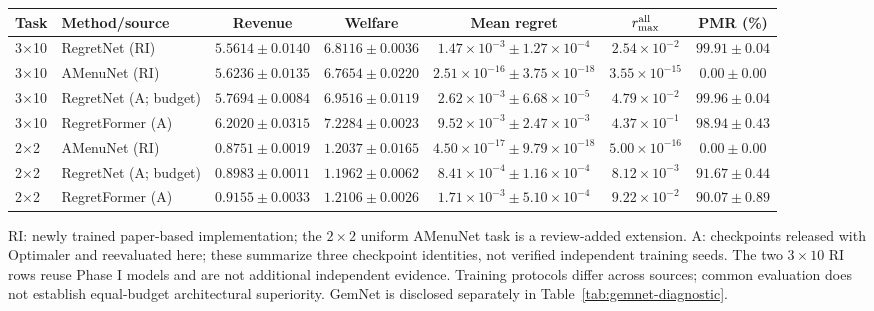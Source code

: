 \begin{table}[!t]
\centering\footnotesize
{}
\label{tab:phase2main}
\setlength{\tabcolsep}{4pt}
\begin{tabular}{llccccc}
\toprule
Task & Method/source & Revenue & Welfare & Mean regret & $r_{\max}^{\rm all}$ & PMR (\%) \\
\midrule
3$\times$10 & RegretNet (RI) & $5.5614\pm 0.0140$ & $6.8116\pm 0.0036$ & $1.47\times10^{-3}\pm 1.27\times10^{-4}$ & $2.54\times10^{-2}$ & $99.91\pm 0.04$ \\
3$\times$10 & AMenuNet (RI) & $5.6236\pm 0.0135$ & $6.7654\pm 0.0220$ & $2.51\times10^{-16}\pm 3.75\times10^{-18}$ & $3.55\times10^{-15}$ & $0.00\pm 0.00$ \\
3$\times$10 & RegretNet (A; budget) & $5.7694\pm 0.0084$ & $6.9516\pm 0.0119$ & $2.62\times10^{-3}\pm 6.68\times10^{-5}$ & $4.79\times10^{-2}$ & $99.96\pm 0.04$ \\
3$\times$10 & RegretFormer (A) & $6.2020\pm 0.0315$ & $7.2284\pm 0.0023$ & $9.52\times10^{-3}\pm 2.47\times10^{-3}$ & $4.37\times10^{-1}$ & $98.94\pm 0.43$ \\
\midrule
2$\times$2 & AMenuNet (RI) & $0.8751\pm 0.0019$ & $1.2037\pm 0.0165$ & $4.50\times10^{-17}\pm 9.79\times10^{-18}$ & $5.00\times10^{-16}$ & $0.00\pm 0.00$ \\
2$\times$2 & RegretNet (A; budget) & $0.8983\pm 0.0011$ & $1.1962\pm 0.0062$ & $8.41\times10^{-4}\pm 1.16\times10^{-4}$ & $8.12\times10^{-3}$ & $91.67\pm 0.44$ \\
2$\times$2 & RegretFormer (A) & $0.9155\pm 0.0033$ & $1.2106\pm 0.0026$ & $1.71\times10^{-3}\pm 5.10\times10^{-4}$ & $9.22\times10^{-2}$ & $90.07\pm 0.89$ \\
\bottomrule
\end{tabular}
\par\smallskip\begin{minipage}{0.98\textwidth}\footnotesize RI: newly trained paper-based implementation; the $2\times2$ uniform AMenuNet task is a review-added extension. A: checkpoints released with Optimaler and reevaluated here; these summarize three checkpoint identities, not verified independent training seeds. The two $3\times10$ RI rows reuse Phase I models and are not additional independent evidence. Training protocols differ across sources; common evaluation does not establish equal-budget architectural superiority. GemNet is disclosed separately in Table~\ref{tab:gemnet-diagnostic}.\end{minipage}
\end{table}
